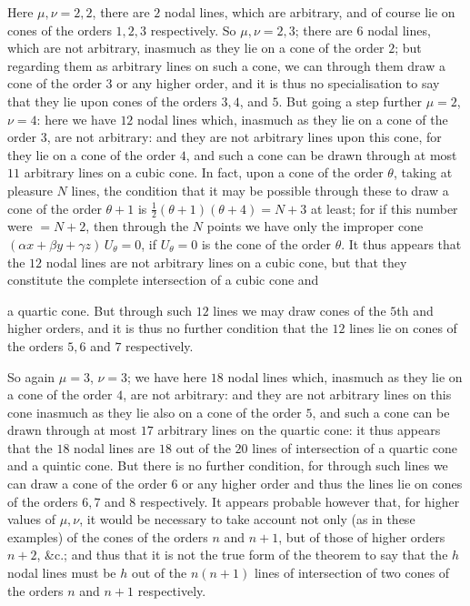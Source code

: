 \documentclass[11pt]{article}
\begin{document}
\noindent
Here $\mu, \nu = 2, 2$, there are $2$ nodal lines, which are arbitrary, and of course lie on cones of the orders $1, 2, 3$ respectively.  So $\mu, \nu = 2, 3$; there are $6$ nodal lines, which are not arbitrary, inasmuch as they lie on a cone of the order $2$; but regarding them as arbitrary lines on such a cone, we can through them draw a cone of the order $3$ or any higher order, and it is thus no specialisation to say that they lie upon cones of the orders $3, 4$, and $5$.  But going a step further $\mu = 2$, $\nu = 4$: here we have $12$ nodal lines which, inasmuch as they lie on a cone of the order $3$, are not arbitrary: and they are not arbitrary lines upon this cone, for they lie on a cone of the order $4$, and such a cone can be drawn through at most $11$ arbitrary lines on a cubic cone.  In fact, upon a cone of the order $\theta$, taking at pleasure $N$ lines, the condition that it may be possible through these to draw a cone of the order $\theta+1$ is $\tfrac{1}{2}(\theta+1)(\theta+4) = N + 3$ at least; for if this number were $=N+2$, then through the $N$ points we have only the improper cone $(\alpha x + \beta y + \gamma z)\,U_{\theta} = 0$, if $U_{\theta} = 0$ is the cone of the order $\theta$.  It thus appears that the $12$ nodal lines are not arbitrary lines on a cubic cone, but that they constitute the complete intersection of a cubic cone and

a quartic cone.  But through such $12$ lines we may draw cones of the $5$th and higher orders, and it is thus no further condition that the $12$ lines lie on cones of the orders $5, 6$ and $7$ respectively.

\medskip\noindent
So again $\mu = 3$, $\nu = 3$; we have here $18$ nodal lines which, inasmuch as they lie on a cone of the order $4$, are not arbitrary: and they are not arbitrary lines on this cone inasmuch as they lie also on a cone of the order $5$, and such a cone can be drawn through at most $17$ arbitrary lines on the quartic cone: it thus appears that the $18$ nodal lines are $18$ out of the $20$ lines of intersection of a quartic cone and a quintic cone.  But there is no further condition, for through such lines we can draw a cone of the order $6$ or any higher order and thus the lines lie on cones of the orders $6, 7$ and $8$ respectively.  It appears probable however that, for higher values of $\mu, \nu$, it would be necessary to take account not only (as in these examples) of the cones of the orders $n$ and $n+1$, but of those of higher orders $n+2$, \&c.; and thus that it is not the true form of the theorem to say that the $h$ nodal lines must be $h$ out of the $n(n+1)$ lines of intersection of two cones of the orders $n$ and $n+1$ respectively.
\end{document}
